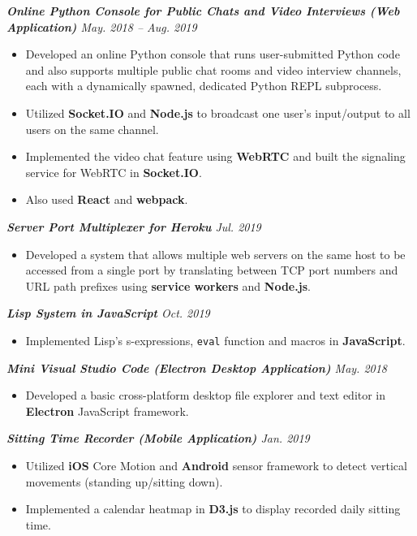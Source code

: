 \documentclass[10pt]{article}
\begin{document}
%
{\itshape {\bfseries Online Python Console for Public Chats and Video Interviews (Web Application)}  \hfill May. 2018 -- Aug. 2019}
\begin{itemize}[leftmargin=15pt, noitemsep, topsep=0pt]
\item Developed an online Python console that runs user-submitted Python code and also supports multiple public chat rooms and video interview channels, each with a dynamically spawned, dedicated Python REPL subprocess.
\item Utilized \textbf{Socket.IO} and \textbf{Node.js} to broadcast one user’s input/output to all users on the same channel.
\item Implemented the video chat feature using \textbf{WebRTC} and built the signaling service for WebRTC in \textbf{Socket.IO}.
\item Also used \textbf{React} and \textbf{webpack}.

\end{itemize}
\vspace{0.5em}
%
{\itshape {\bfseries Server Port Multiplexer for Heroku}  \hfill Jul. 2019}
\begin{itemize}[leftmargin=15pt, noitemsep, topsep=0pt]
\item Developed a system that allows multiple web servers on the same host to be accessed from a single port by translating between TCP port numbers and URL path prefixes using \textbf{service workers} and \textbf{Node.js}. 
\end{itemize}
\vspace{0.2em}
%
{\itshape {\bfseries Lisp System in JavaScript}  \hfill Oct. 2019}
\begin{itemize}[leftmargin=15pt, noitemsep, topsep=0pt]
\item Implemented Lisp's s-expressions, \texttt{eval} function and macros in \textbf{JavaScript}.
\end{itemize}
\vspace{0.2em}
%
{\itshape {\bfseries Mini Visual Studio Code (Electron Desktop Application)}  \hfill May. 2018}
\begin{itemize}[leftmargin=15pt, noitemsep, topsep=0pt]
\item Developed a basic cross-platform desktop file explorer and text editor in \textbf{Electron} JavaScript framework.
\end{itemize}
\vspace{0.2em}
%
{\itshape {\bfseries Sitting Time Recorder (Mobile Application)}  \hfill Jan. 2019}
\begin{itemize}[leftmargin=15pt, noitemsep, topsep=0pt]
\item Utilized \textbf{iOS} Core Motion and \textbf{Android} sensor framework to detect vertical movements (standing up/sitting down).
\item Implemented a calendar heatmap in \textbf{D3.js} to display recorded daily sitting time.
\end{itemize}
%
\vspace{-0.5em}
\end{document}
